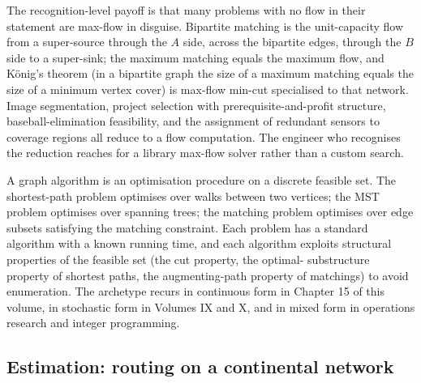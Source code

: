 

The recognition-level payoff is that many problems with no flow in
their statement are max-flow in disguise. Bipartite matching is the
unit-capacity flow from a super-source through the $A$ side, across
the bipartite edges, through the $B$ side to a super-sink; the
maximum matching equals the maximum flow, and K\"{o}nig's theorem
(in a bipartite graph the size of a maximum matching equals the size
of a minimum vertex cover) is max-flow min-cut specialised to that
network. Image segmentation, project selection with
prerequisite-and-profit structure, baseball-elimination feasibility,
and the assignment of redundant sensors to coverage regions all
reduce to a flow computation. The engineer who recognises the
reduction reaches for a library max-flow solver rather than a custom
search.

\begin{archetype}[Optimisation]
A graph algorithm is an optimisation procedure on a discrete
feasible set. The shortest-path problem optimises over walks
between two vertices; the MST problem optimises over spanning
trees; the matching problem optimises over edge subsets satisfying
the matching constraint. Each problem has a standard algorithm with
a known running time, and each algorithm exploits structural
properties of the feasible set (the cut property, the optimal-
substructure property of shortest paths, the augmenting-path
property of matchings) to avoid enumeration. The archetype recurs
in continuous form in Chapter 15 of this volume, in stochastic
form in Volumes IX and X, and in mixed form in operations research
and integer programming.
\end{archetype}

\subsection{Estimation: routing on a continental network}

